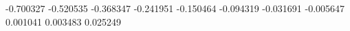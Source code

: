 -0.700327
-0.520535
-0.368347
-0.241951
-0.150464
-0.094319
-0.031691
-0.005647
0.001041
0.003483
0.025249
